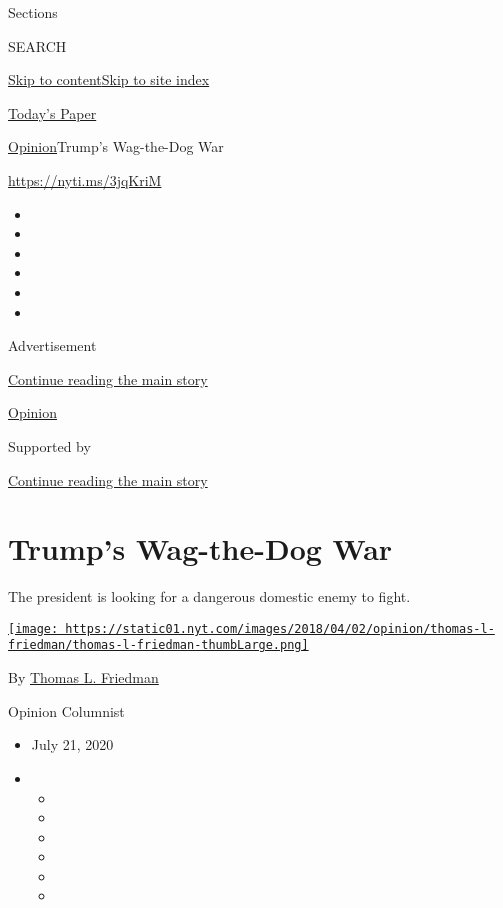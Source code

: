 Sections

SEARCH

\protect\hyperlink{site-content}{Skip to
content}\protect\hyperlink{site-index}{Skip to site index}

\href{https://myaccount.nytimes.com/auth/login?response_type=cookie\&client_id=vi}{}

\href{https://www.nytimes.com/section/todayspaper}{Today's Paper}

\href{/section/opinion}{Opinion}\textbar{}Trump's Wag-the-Dog War

\href{https://nyti.ms/3jqKriM}{https://nyti.ms/3jqKriM}

\begin{itemize}
\item
\item
\item
\item
\item
\item
\end{itemize}

Advertisement

\protect\hyperlink{after-top}{Continue reading the main story}

\href{/section/opinion}{Opinion}

Supported by

\protect\hyperlink{after-sponsor}{Continue reading the main story}

\hypertarget{trumps-wag-the-dog-war}{%
\section{Trump's Wag-the-Dog War}\label{trumps-wag-the-dog-war}}

The president is looking for a dangerous domestic enemy to fight.

\href{https://www.nytimes.com/by/thomas-l-friedman}{\texttt{[image: https://static01.nyt.com/images/2018/04/02/opinion/thomas-l-friedman/thomas-l-friedman-thumbLarge.png]}}

By \href{https://www.nytimes.com/by/thomas-l-friedman}{Thomas L.
Friedman}

Opinion Columnist

\begin{itemize}
\item
  July 21, 2020
\item
  \begin{itemize}
  \item
  \item
  \item
  \item
  \item
  \item
  \end{itemize}
\end{itemize}


